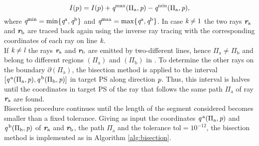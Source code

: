 \begin{equation}
I(p) = I(p)+\textit{q}^{\textrm{max}}(\Pi_\textrm{a}, \textit{p})-\textit{q}^{\textrm{min}}(\Pi_\textrm{a}, \textit{p}),
\end{equation}
where $\textit{q}^{\textrm{min}} = \min\{\textit{q}^{\textrm{a}}, \textit{q}^{\textrm{b}}\}$ and $\textit{q}^{\textrm{max}} = \max\{\textit{q}^{\textrm{a}}, \textit{q}^{\textrm{b}}\}$. In case $\textit{k}\neq1$ the two rays $\textit{\textbf{r}}_{\textrm{a}}$ and $\textit{\textbf{r}}_{\textrm{b}}$ are traced back again using the inverse ray tracing with the corresponding coordinates of each ray on line $\textit{k}$.
\\ \indent If $\textit{k}\neq \textit{l}$ the rays $\textit{\textbf{r}}_\textrm{a}$ and $\textit{\textbf{r}}_\textrm{b}$ are emitted by two-different lines, hence $\Pi_{\textrm{a}}\neq \Pi_{\textrm{b}}$ and belong to different regions $(\Pi_{\textrm{a}})$ and $(\Pi_{\textrm{b}})$ in . To determine the other rays on the boundary $\partial$$(\Pi_{\textrm{a}})$, the bisection method is applied to the interval $[\textit{q}^{\,\textrm{a}}(\Pi_{\textrm{a}}, \textit{p}), \textit{q}^{\,\textrm{b}}(\Pi_{\textrm{b}}, \textit{p})]$ in target PS  along direction $\textit{p}$. Thus, this interval is halves until the coordinates in target PS of the ray that follows the same path $\Pi_{\textrm{a}}$ of ray $\textit{\textbf{r}}_{\textrm{a}}$ are found. \\ \indent Bisection procedure continues until the length of the segment considered becomes smaller than a fixed tolerance. 
Giving as input the coordinates $\textit{q}^{\,\textrm{a}}(\Pi_{\textrm{a}}, \textit{p})$ and $\textit{q}^{\,\textrm{b}}(\Pi_{\textrm{b}}, \textit{p})$ of $\textit{\textbf{r}}_{\textrm{a}}$ and $\textit{\textbf{r}}_{\textrm{b}}$, the path $\Pi_\textrm{a}$ and the tolerance $\textrm{tol}= 10^{-12}$, the bisection method is implemented as in Algorithm \ref{alg:bisection}.
